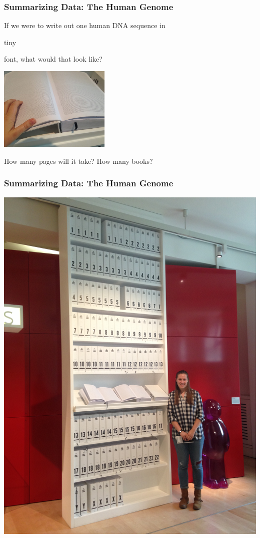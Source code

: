 \documentclass[12pt, 
hyperref={colorlinks=true, linkcolor=blue, urlcolor=cyan}]{beamer}
\begin{document}
\begin{frame}
\frametitle{Summarizing Data: The Human Genome}
If we were to write out one human DNA sequence in \begin{tiny} tiny \end{tiny} font, what would that look like? 

\center \includegraphics[height=4cm]{./book}

How many pages will it take? How many books?
\end{frame}

\begin{frame}
\frametitle{Summarizing Data: The Human Genome}
\vspace{-0.5cm}
\center \includegraphics[height=0.65\textheight, angle = 270]{./bookcase}
\end{frame}
\end{document}
